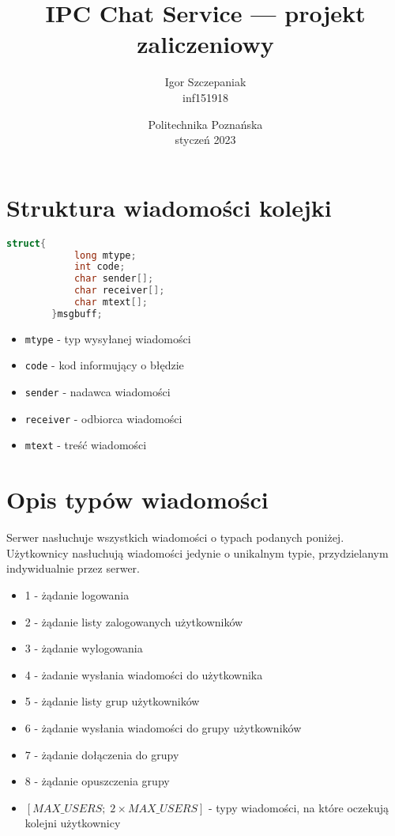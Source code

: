 \documentclass{article}
\begin{document}
	\title{IPC Chat Service — projekt zaliczeniowy}
	\date{Politechnika Poznańska\\ styczeń 2023}
	\author{Igor Szczepaniak \\ inf151918}
	\maketitle
	\section{Struktura wiadomości kolejki}
	\begin{lstlisting}[language=C]
		struct{
			long mtype;
			int code;
			char sender[];
			char receiver[];
			char mtext[];
		}msgbuff;
	\end{lstlisting}

	\begin{itemize}
		\item \verb+mtype+ - typ wysyłanej wiadomości
		\item \verb+code+ - kod informujący o błędzie
		\item \verb+sender+ - nadawca wiadomości
		\item \verb+receiver+ - odbiorca wiadomości
		\item \verb+mtext+ - treść wiadomości
	\end{itemize}
	
	\newpage

	\section{Opis typów wiadomości}
		Serwer nasłuchuje wszystkich wiadomości o typach podanych poniżej. Użytkownicy nasłuchują wiadomości jedynie o unikalnym typie, przydzielanym indywidualnie przez serwer.
	\begin{itemize}
		\item 1 - żądanie logowania
		\item 2 - żądanie listy zalogowanych użytkowników
		\item 3 - żądanie wylogowania
		\item 4 - żadanie wysłania wiadomości do użytkownika
		\item 5 - żądanie listy grup użytkowników
		\item 6 - żądanie wysłania wiadomości do grupy użytkowników
		\item 7 - żądanie dołączenia do grupy
		\item 8 - żądanie opuszczenia grupy
		\item $\left[MAX\_USERS; \; 2\times MAX\_USERS\right]$ - typy wiadomości, na które oczekują kolejni użytkownicy
	\end{itemize}
\end{document}
